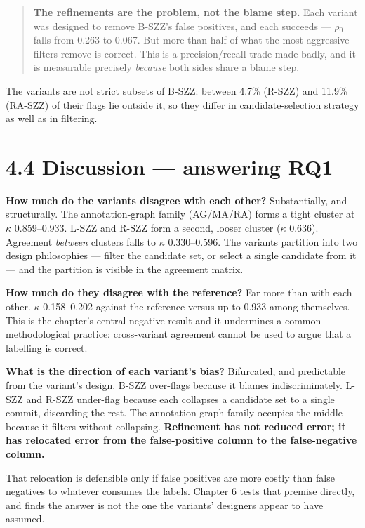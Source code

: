 \begin{quote}
\textbf{The refinements are the problem, not the blame step.} Each
variant was designed to remove B-SZZ's false positives, and each
succeeds --- \ensuremath{\rho}\ensuremath{_0} falls from 0.263 to 0.067. But more than half of what
the most aggressive filters remove is correct. This is a
precision/recall trade made badly, and it is measurable precisely
\emph{because} both sides share a blame step.
\end{quote}

The variants are not strict subsets of B-SZZ: between 4.7\% (R-SZZ) and
11.9\% (RA-SZZ) of their flags lie outside it, so they differ in
candidate-selection strategy as well as in filtering.

\section{4.4 Discussion --- answering
RQ1}\label{discussion-answering-rq1}

\textbf{How much do the variants disagree with each other?}
Substantially, and structurally. The annotation-graph family (AG/MA/RA)
forms a tight cluster at \ensuremath{\kappa} 0.859--0.933. L-SZZ and R-SZZ form a second,
looser cluster (\ensuremath{\kappa} 0.636). Agreement \emph{between} clusters falls to \ensuremath{\kappa}
0.330--0.596. The variants partition into two design philosophies ---
filter the candidate set, or select a single candidate from it --- and
the partition is visible in the agreement matrix.

\textbf{How much do they disagree with the reference?} Far more than
with each other. \ensuremath{\kappa} 0.158--0.202 against the reference versus up to 0.933
among themselves. This is the chapter's central negative result and it
undermines a common methodological practice: cross-variant agreement
cannot be used to argue that a labelling is correct.

\textbf{What is the direction of each variant's bias?} Bifurcated, and
predictable from the variant's design. B-SZZ over-flags because it
blames indiscriminately. L-SZZ and R-SZZ under-flag because each
collapses a candidate set to a single commit, discarding the rest. The
annotation-graph family occupies the middle because it filters without
collapsing. \textbf{Refinement has not reduced error; it has relocated
error from the false-positive column to the false-negative column.}

That relocation is defensible only if false positives are more costly
than false negatives to whatever consumes the labels. Chapter 6 tests
that premise directly, and finds the answer is not the one the variants'
designers appear to have assumed.


